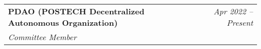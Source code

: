 \documentclass[letterpaper,11pt]{article}
\makeatletter
\newcommand{\resumeOrganizationHeading}[4]{
  \vspace{-2pt}\item
    \begin{tabular*}{0.97\textwidth}[t]{l@{\extracolsep{\fill}}r}
      \textbf{#1} & \textit{\small #2} \\
      \textit{\small#3}
    \end{tabular*}\vspace{-7pt}
}
\newcommand{\resumeSubHeadingListStart}{\begin{itemize}[leftmargin=0.15in, label={}]}
\newcommand{\resumeSubHeadingListEnd}{\end{itemize}}
\makeatother
\begin{document}
    \resumeOrganizationHeading
        {PDAO (POSTECH Decentralized Autonomous Organization)} {Apr 2022 -- Present}{Committee Member}
    
  \resumeSubHeadingListEnd











\end{document}
